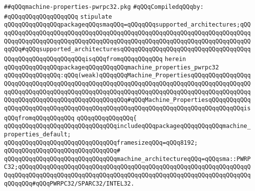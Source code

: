 \label{src/lib/compiler/back/low/main/pwrpc32/machine-properties-pwrpc32.pkg}
\verb|##qQQqmachine-properties-pwrpc32.pkg|\newline
\newline
\verb|#qQQqCompiledqQQqby:|\newline
\verb|#qQQqqQQqqQQqqQQqqQQq|\newline
\newline
\verb|stipulate|\newline
\verb|qQQqqQQqqQQqqQQqpackageqQQqsmaqQQq=qQQqqQQqsupported_architectures;qQQqqQQqqQQqqQQqqQQqqQQqqQQqqQQqqQQqqQQqqQQqqQQqqQQqqQQqqQQqqQQqqQQqqQQqqQQqqQQqqQQqqQQqqQQqqQQqqQQqqQQqqQQqqQQqqQQqqQQqqQQqqQQqqQQqqQQqqQQqqQQqqQQq#qQQqsupported_architecturesqQQqqQQqqQQqqQQqqQQqqQQqqQQqqQQqqQQqqQQqqQQqqQQqqQQqqQQqqQQqisqQQqfromqQQqqQQqqQQq|\newline
\verb|herein|\newline
\newline
\verb|qQQqqQQqqQQqqQQqpackageqQQqqQQqqQQqmachine_properties_pwrpc32|\newline
\verb|qQQqqQQqqQQqqQQq:qQQq(weak)qQQqqQQqMachine_PropertiesqQQqqQQqqQQqqQQqqQQqqQQqqQQqqQQqqQQqqQQqqQQqqQQqqQQqqQQqqQQqqQQqqQQqqQQqqQQqqQQqqQQqqQQqqQQqqQQqqQQqqQQqqQQqqQQqqQQqqQQqqQQqqQQqqQQqqQQqqQQqqQQqqQQqqQQqqQQqqQQqqQQqqQQqqQQqqQQqqQQqqQQqqQQqqQQq#qQQqMachine_PropertiesqQQqqQQqqQQqqQQqqQQqqQQqqQQqqQQqqQQqqQQqqQQqqQQqqQQqqQQqqQQqqQQqqQQqqQQqqQQqqQQqisqQQqfromqQQqqQQqqQQq|\newline
\verb|qQQqqQQqqQQqqQQq{|\newline
\verb|qQQqqQQqqQQqqQQqqQQqqQQqqQQqqQQqincludeqQQqpackageqQQqqQQqqQQqmachine_properties_default;|\newline
\newline
\verb|qQQqqQQqqQQqqQQqqQQqqQQqqQQqqQQqframesizeqQQq=qQQq8192;|\newline
\verb|qQQqqQQqqQQqqQQqqQQqqQQqqQQqqQQq#|\newline
\verb|qQQqqQQqqQQqqQQqqQQqqQQqqQQqqQQqmachine_architectureqQQq=qQQqsma::PWRPC32;qQQqqQQqqQQqqQQqqQQqqQQqqQQqqQQqqQQqqQQqqQQqqQQqqQQqqQQqqQQqqQQqqQQqqQQqqQQqqQQqqQQqqQQqqQQqqQQqqQQqqQQqqQQqqQQqqQQqqQQqqQQqqQQqqQQqqQQqqQQqqQQq#qQQqPWRPC32/SPARC32/INTEL32.|\newline

